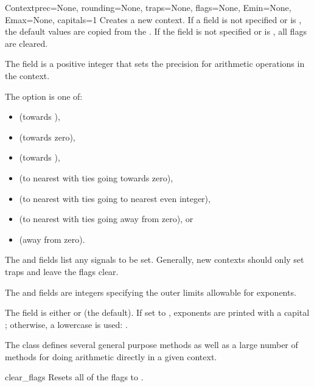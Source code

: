 \begin{classdesc}{Context}{prec=None, rounding=None, traps=None,
        flags=None, Emin=None, Emax=None, capitals=1}
  Creates a new context.  If a field is not specified or is ,
  the default values are copied from the .  If the
   field is not specified or is , all flags are
  cleared.

  The  field is a positive integer that sets the precision for
  arithmetic operations in the context.

  The  option is one of:
  \begin{itemize}
  \item {} (towards ),
  \item {} (towards zero),
  \item {} (towards ),
  \item {} (to nearest with ties going towards zero),
  \item {} (to nearest with ties going to nearest even integer),
  \item {} (to nearest with ties going away from zero), or
  \item {} (away from zero).
  \end{itemize}

  The  and  fields list any signals to be set.
  Generally, new contexts should only set traps and leave the flags clear.

  The  and  fields are integers specifying the outer
  limits allowable for exponents.

  The  field is either  or  (the
  default). If set to , exponents are printed with a capital
  ; otherwise, a lowercase  is used:
  .
\end{classdesc}

The  class defines several general purpose methods as well as a
large number of methods for doing arithmetic directly in a given context.

\begin{methoddesc}{clear_flags}{}
  Resets all of the flags to .
\end{methoddesc}  


